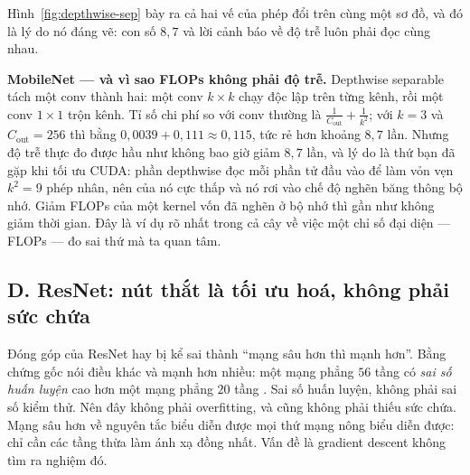 \documentclass[../../../deep_learning.tex]{subfiles}
\begin{document}
Hình~\ref{fig:depthwise-sep} bày ra cả hai vế của phép đổi trên cùng một sơ đồ, và đó là lý do nó đáng vẽ: con số \(8{,}7\) và lời cảnh báo về độ trễ luôn phải đọc cùng nhau.

\textbf{MobileNet --- và vì sao FLOPs không phải độ trễ.} Depthwise separable tách một conv thành hai: một conv \(k\times k\) chạy độc lập trên từng kênh, rồi một conv \(1\times1\) trộn kênh. Tỉ số chi phí so với conv thường là \(\frac{1}{C_{\text{out}}} + \frac{1}{k^2}\); với \(k=3\) và \(C_{\text{out}}=256\) thì bằng \(0{,}0039 + 0{,}111 \approx 0{,}115\), tức rẻ hơn khoảng \(8{,}7\) lần. Nhưng độ trễ thực đo được hầu như không bao giờ giảm \(8{,}7\) lần, và lý do là thứ bạn đã gặp khi tối ưu CUDA: phần depthwise đọc mỗi phần tử đầu vào để làm vỏn vẹn \(k^2 = 9\) phép nhân, nên  của nó cực thấp và nó rơi vào chế độ nghẽn băng thông bộ nhớ. Giảm FLOPs của một kernel vốn đã nghẽn ở bộ nhớ thì gần như không giảm thời gian. Đây là ví dụ rõ nhất trong cả cây về việc một chỉ số đại diện --- FLOPs --- đo sai thứ mà ta quan tâm.

\subsection{D. ResNet: nút thắt là tối ưu hoá, không phải sức chứa}
Đóng góp của ResNet hay bị kể sai thành ``mạng sâu hơn thì mạnh hơn''. Bằng chứng gốc nói điều khác và mạnh hơn nhiều: một mạng phẳng \(56\) tầng có \emph{sai số huấn luyện} cao hơn một mạng phẳng \(20\) tầng \cite{he2016resnet}. Sai số huấn luyện, không phải sai số kiểm thử. Nên đây không phải overfitting, và cũng không phải thiếu sức chứa. Mạng sâu hơn về nguyên tắc biểu diễn được mọi thứ mạng nông biểu diễn được: chỉ cần các tầng thừa làm ánh xạ đồng nhất. Vấn đề là gradient descent không tìm ra nghiệm đó.
\end{document}
